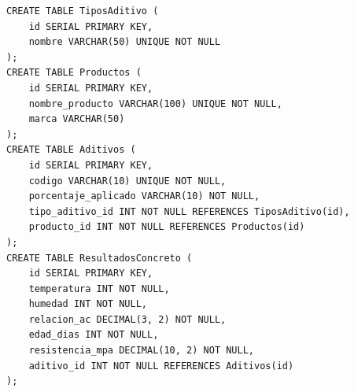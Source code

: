 \begin{lstlisting}[style=sqlstyle, caption=Script DDL para PostgreSQL.]
CREATE TABLE TiposAditivo (
    id SERIAL PRIMARY KEY,
    nombre VARCHAR(50) UNIQUE NOT NULL
);
CREATE TABLE Productos (
    id SERIAL PRIMARY KEY,
    nombre_producto VARCHAR(100) UNIQUE NOT NULL,
    marca VARCHAR(50)
);
CREATE TABLE Aditivos (
    id SERIAL PRIMARY KEY,
    codigo VARCHAR(10) UNIQUE NOT NULL,
    porcentaje_aplicado VARCHAR(10) NOT NULL,
    tipo_aditivo_id INT NOT NULL REFERENCES TiposAditivo(id),
    producto_id INT NOT NULL REFERENCES Productos(id)
);
CREATE TABLE ResultadosConcreto (
    id SERIAL PRIMARY KEY,
    temperatura INT NOT NULL,
    humedad INT NOT NULL,
    relacion_ac DECIMAL(3, 2) NOT NULL,
    edad_dias INT NOT NULL,
    resistencia_mpa DECIMAL(10, 2) NOT NULL,
    aditivo_id INT NOT NULL REFERENCES Aditivos(id)
);
\end{lstlisting}
